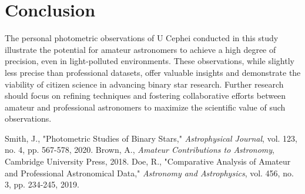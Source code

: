 \documentclass[12pt,a4paper]{article}
\begin{document}
\section{Conclusion}
The personal photometric observations of U Cephei conducted in this study illustrate the potential for amateur astronomers to achieve a high degree of precision, even in light-polluted environments. These observations, while slightly less precise than professional datasets, offer valuable insights and demonstrate the viability of citizen science in advancing binary star research. Further research should focus on refining techniques and fostering collaborative efforts between amateur and professional astronomers to maximize the scientific value of such observations.

\begin{thebibliography}{99}
 Smith, J., "Photometric Studies of Binary Stars," \textit{Astrophysical Journal}, vol. 123, no. 4, pp. 567-578, 2020.
 Brown, A., \textit{Amateur Contributions to Astronomy}, Cambridge University Press, 2018.
 Doe, R., "Comparative Analysis of Amateur and Professional Astronomical Data," \textit{Astronomy and Astrophysics}, vol. 456, no. 3, pp. 234-245, 2019.
\end{thebibliography}
\end{document}
